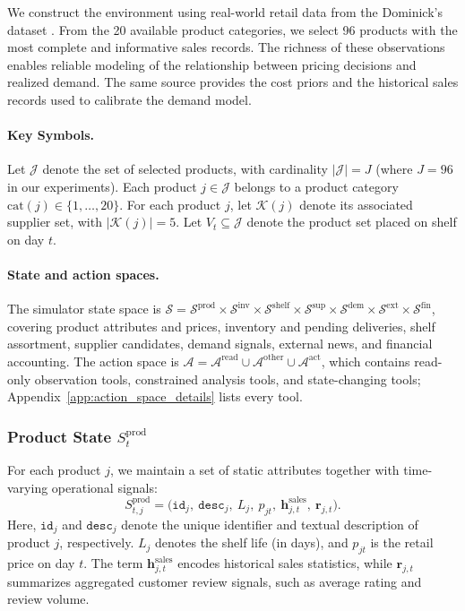 We construct the environment using real-world retail data from the Dominick’s dataset \citep{DominicksDataset}. From the 20 available product categories, we select 96 products with the most complete and informative sales records. The richness of these observations enables reliable modeling of the relationship between pricing decisions and realized demand. The same source provides the cost priors and the historical sales records used to calibrate the demand model.

\paragraph{Key Symbols.}
Let $\mathcal{J}$ denote the set of selected products, with cardinality $|\mathcal{J}| = J$ (where $J=96$ in our experiments). Each product $j \in \mathcal{J}$ belongs to a product category $\mathrm{cat}(j) \in \{1,\ldots,20\}$. For each product $j$, let $\mathcal{K}(j)$ denote its associated supplier set, with $|\mathcal{K}(j)| = 5$. Let $V_t\subseteq\mathcal{J}$ denote the product set placed on shelf on day $t$.

\paragraph{State and action spaces.}
The simulator state space is $\mathcal{S}=\mathcal{S}^{\mathrm{prod}}\times\mathcal{S}^{\mathrm{inv}}\times\mathcal{S}^{\mathrm{shelf}}\times\mathcal{S}^{\mathrm{sup}}\times\mathcal{S}^{\mathrm{dem}}\times\mathcal{S}^{\mathrm{ext}}\times\mathcal{S}^{\mathrm{fin}}$, covering product attributes and prices, inventory and pending deliveries, shelf assortment, supplier candidates, demand signals, external news, and financial accounting. The action space is $\mathcal{A}=\mathcal{A}^{\mathrm{read}}\cup\mathcal{A}^{\mathrm{other}}\cup\mathcal{A}^{\mathrm{act}}$, which contains read-only observation tools, constrained analysis tools, and state-changing tools; Appendix~\ref{app:action_space_details} lists every tool.

\subsubsection{Product State \texorpdfstring{$S_t^{\text{prod}}$}{S t prod}}

For each product $j$, we maintain a set of static attributes together with time-varying operational signals:
\begin{equation}
S_{t,j}^{\text{prod}} =
\big(
\texttt{id}_j,\ \texttt{desc}_j,\ L_j,\ p_{jt},\ \mathbf{h}^{\text{sales}}_{j,t},\ \mathbf{r}_{j,t}
\big).
\end{equation}
Here, $\texttt{id}_j$ and $\texttt{desc}_j$ denote the unique identifier and textual description of product $j$, respectively. $L_j$ denotes the shelf life (in days), and $p_{jt}$ is the retail price on day $t$. The term $\mathbf{h}^{\text{sales}}_{j,t}$ encodes historical sales statistics, while $\mathbf{r}_{j,t}$ summarizes aggregated customer review signals, such as average rating and review volume.

